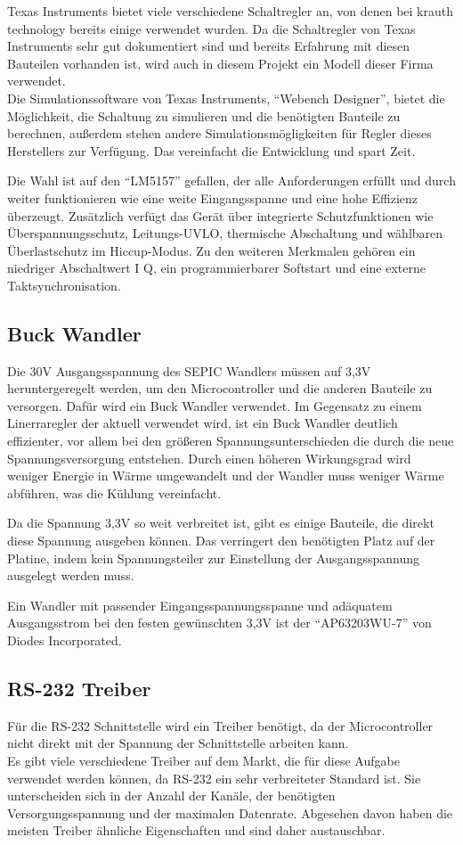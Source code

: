 Texas Instruments bietet viele verschiedene Schaltregler an, von denen bei krauth technology bereits einige
verwendet wurden. Da die Schaltregler von Texas Instruments sehr gut dokumentiert sind und bereits Erfahrung
mit diesen Bauteilen vorhanden ist, wird auch in diesem Projekt ein Modell dieser Firma verwendet. \\
Die Simulationssoftware von Texas Instruments, \enquote{Webench Designer}, bietet die Möglichkeit, die
Schaltung zu simulieren und die benötigten Bauteile zu berechnen, außerdem stehen andere
Simulationsmögligkeiten für Regler dieses Herstellers zur Verfügung. Das vereinfacht die Entwicklung und
spart Zeit.

Die Wahl ist auf den \enquote{LM5157} gefallen, der alle Anforderungen erfüllt und durch weiter funktionieren
wie eine weite Eingangsspanne und eine hohe Effizienz überzeugt. Zusätzlich verfügt das Gerät über integrierte
Schutzfunktionen wie Überspannungsschutz, Leitungs-UVLO, thermische Abschaltung und wählbaren Überlastschutz
im Hiccup-Modus. Zu den weiteren Merkmalen gehören ein niedriger Abschaltwert I Q, ein programmierbarer Softstart 
und eine externe Taktsynchronisation.

\subsection{Buck Wandler}
Die 30V Ausgangsspannung des \ac{SEPIC} Wandlers müssen auf 3,3V heruntergeregelt werden, um den Microcontroller
und die anderen Bauteile zu versorgen. Dafür wird ein Buck Wandler verwendet. Im Gegensatz zu einem Linerraregler
der aktuell verwendet wird, ist ein Buck Wandler deutlich effizienter, vor allem bei den größeren Spannungsunterschieden
die durch die neue Spannungsversorgung entstehen. Durch einen höheren Wirkungsgrad wird weniger Energie in Wärme
umgewandelt und der Wandler muss weniger Wärme abführen, was die Kühlung vereinfacht.

Da die Spannung 3,3V so weit verbreitet ist, gibt es einige Bauteile, die direkt diese Spannung ausgeben können.
Das verringert den benötigten Platz auf der Platine, indem kein Spannungsteiler zur Einstellung der Ausgangsspannung
ausgelegt werden muss.

Ein Wandler mit passender Eingangsspannungsspanne und adäquatem Ausgangsstrom bei den festen gewünschten 3,3V ist der
\enquote{AP63203WU-7} von Diodes Incorporated.

\subsection{RS-232 Treiber}
Für die RS-232 Schnittstelle wird ein Treiber benötigt, da der Microcontroller nicht direkt mit der Spannung der
Schnittstelle arbeiten kann. \\
Es gibt viele verschiedene Treiber auf dem Markt, die für diese Aufgabe verwendet werden können, da RS-232 ein
sehr verbreiteter Standard ist. Sie unterscheiden sich in der Anzahl der Kanäle, der benötigten Versorgungsspannung
und der maximalen Datenrate. Abgesehen davon haben die meisten Treiber ähnliche Eigenschaften und sind daher
austauschbar.

